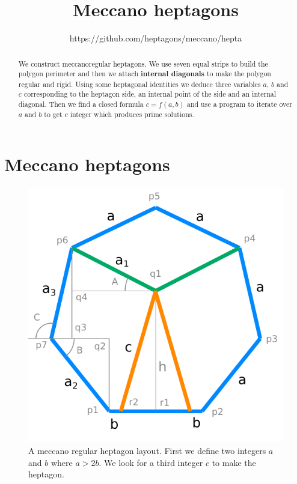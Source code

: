 \documentclass[11pt]{article}
\title{\textbf{Meccano heptagons}}
\author{https://github.com/heptagons/meccano/hepta}
\date{}
\begin{document}
\maketitle
\begin{abstract}
We construct meccano\meccanoref regular heptagons.
We use seven equal strips to build the polygon perimeter and then we attach \textbf{internal diagonals} to make the polygon regular and rigid. Using some
heptagonal identities we deduce three variables $a$, $b$ and $c$ corresponding
to the heptagon side, an internal point of the side and an internal diagonal.
Then we find a closed formula $c = f(a,b)$ and use a program to iterate over $a$ and
$b$ to get $c$ integer which produces prime solutions.
\end{abstract}

\section{Meccano heptagons}

\begin{figure}[htp]
\centering
\includegraphics[scale=1]{figs/heptagon_plan.pdf}
\caption{A meccano regular heptagon layout. First we define two integers $a$ and $b$ where $a > 2b$. We look for a third integer $c$ to make the heptagon.}
\label{heptagonplan}
\end{figure}
\end{document}

